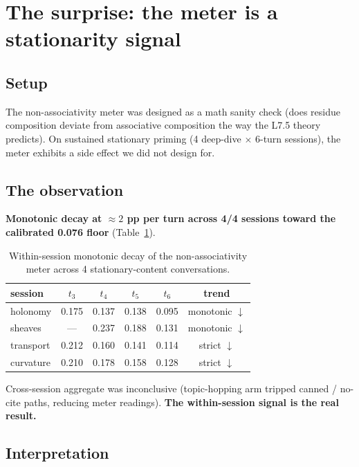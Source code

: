 \documentclass[11pt,letterpaper]{article}
\begin{document}
\section{The surprise: the meter is a stationarity signal}
\label{sec:surprise}

\subsection{Setup}

The non-associativity meter was designed as a math sanity check (does
residue composition deviate from associative composition the way the
L7.5 theory predicts). On sustained stationary priming (4 deep-dive
$\times$ 6-turn sessions), the meter exhibits a side effect we did
not design for.

\subsection{The observation}

\textbf{Monotonic decay at $\approx 2$ pp per turn across 4/4
sessions toward the calibrated 0.076 floor}
(Table~\ref{tab:stationarity}).

\begin{table}[h]
\centering
\begin{tabular}{lccccc}
\toprule
session    & $t_3$ & $t_4$ & $t_5$ & $t_6$ & trend \\
\midrule
holonomy   & 0.175 & 0.137 & 0.138 & 0.095 & monotonic $\downarrow$ \\
sheaves    & ---   & 0.237 & 0.188 & 0.131 & monotonic $\downarrow$ \\
transport  & 0.212 & 0.160 & 0.141 & 0.114 & strict $\downarrow$ \\
curvature  & 0.210 & 0.178 & 0.158 & 0.128 & strict $\downarrow$ \\
\bottomrule
\end{tabular}
\caption{Within-session monotonic decay of the non-associativity
meter across 4 stationary-content conversations.}
\label{tab:stationarity}
\end{table}

Cross-session aggregate was inconclusive (topic-hopping arm tripped
canned / no-cite paths, reducing meter readings). \textbf{The
within-session signal is the real result.}

\subsection{Interpretation}
\end{document}
